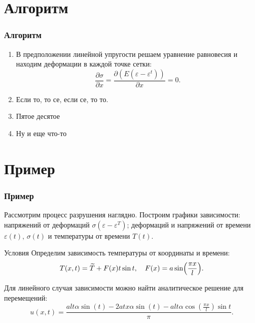 \documentclass[unicode, 8pt]{beamer}
\begin{document}
    \section{Алгоритм}
    \begin{frame}
        \frametitle{Алгоритм}
            \begin{enumerate}
                \item В предположении линейной упругости решаем уравнение равновесия и находим деформации в каждой точке сетки:
                \[
                    \dfrac{\partial \sigma}{\partial x} = \dfrac{\partial (E (\varepsilon - \varepsilon^t))}{\partial x} = 0.
                \]
                \item Если то, то се, если се, то то.
                \item Пятое десятое
                \item Ну и еще что-то
            \end{enumerate}
    \end{frame}

    \section{Пример}
    \begin{frame}
        \frametitle{Пример}
        Рассмотрим процесс разрушения наглядно. Построим графики зависимости: напряжений от деформаций $\sigma(\varepsilon - \varepsilon^T)$; деформаций и напряжений от времени $\varepsilon(t), \, \sigma(t)$ и температуры от времени $T(t)$.

        \vspace{0.7em}

        \begin{block}{Условия}
            Определим зависимость температуры от координаты и времени:
            \[
                T(x, t) = \widetilde{T} + F(x) t \sin t, \quad F(x) = a \sin \Bigl( \dfrac{\pi x}{l} \Bigr). 
            \]

            Для линейного случая зависимости можно найти аналитическое решение для перемещений:
            \[
                u(x, t) = \dfrac{a l t \alpha \sin(t) - 2 a t x \alpha \sin(t) - a l t \alpha \cos (\tfrac{\pi x}{l}) \sin t}{\pi}.
            \]
        \end{block}
    \end{frame}
\end{document}
